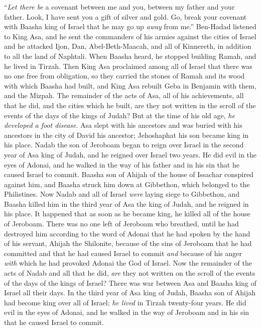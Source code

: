 \begin{biblechapter}
\verse “\textit{Let there be} a covenant between me and you, between my father and your father. Look, I have sent you a gift of silver and gold. Go, break your covenant with Baasha king of Israel that he may go up \textit{away} from me.”
\verse Ben-Hadad listened to King Asa, and he sent the commanders of his armies against the cities of Israel and he attacked Ijon, Dan, Abel-Beth-Maacah, and all of Kinnereth, in addition to all the land of Naphtali.
\verse When Baasha heard, he stopped building Ramah, and he lived in Tirzah.
\verse Then King Asa proclaimed among all of Israel that there was no one free from obligation, so they carried the stones of Ramah and its wood with which Baasha had built, and King Asa rebuilt Geba in Benjamin with them, and the Mizpah.
\verse The remainder of the acts of Asa, all of his achievements, all that he did, and the cities which he built, are they not written in the scroll of the events of the days of the kings of Judah? But at the time of his old age, \textit{he developed a foot disease}.
\verse Asa slept with his ancestors and was buried with his ancestors in the city of David his ancestor; Jehoshaphat his son became king in his place.
 Nadab the son of Jeroboam began to reign over Israel in the second year of Asa king of Judah, and he reigned over Israel two years.
\verse He did evil in the eyes of Adonai, and he walked in the way of his father and in his sin that he caused Israel to commit.
\verse Baasha son of Ahijah of the house of Issachar conspired against him, and Baasha struck him down at Gibbethon, which belonged to the Philistines. Now Nadab and all of Israel \textit{were} laying siege to Gibbethon,
\verse and Baasha killed him in the third year of Asa the king of Judah, and he reigned in his place.
\verse It happened that as soon as he became king, he killed all of the house of Jeroboam. There was no one left of Jeroboam who breathed, until he had destroyed him according to the word of Adonai that he had spoken by the hand of his servant, Ahijah the Shilonite,
\verse because of the sins of Jeroboam that he had committed and that he had caused Israel to commit \textit{and} because of his anger \textit{with} which he had provoked Adonai the God of Israel.
\verse Now the remainder of the acts of Nadab and all that he did, \textit{are} they not written on the scroll of the events of the days of the kings of Israel?
 There was war between Asa and Baasha king of Israel all their days.
\verse In the third year of Asa king of Judah, Baasha son of Ahijah had become king over all of Israel; \textit{he lived} in Tirzah twenty-four years.
\verse He did evil in the eyes of Adonai, and he walked in the way of Jeroboam and in his sin that he caused Israel to commit.
\end{biblechapter}

